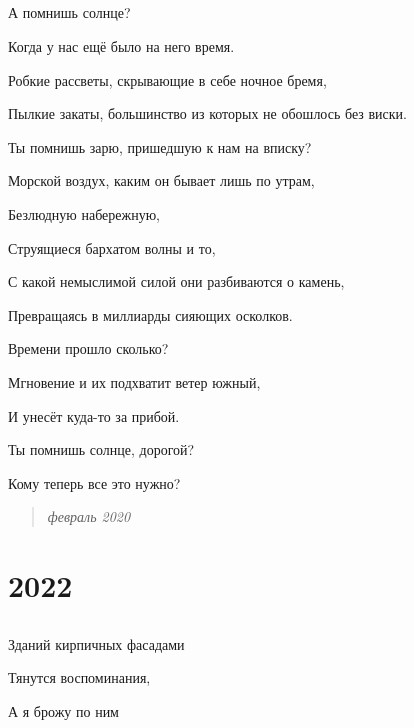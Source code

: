 \documentclass[
  a5paperpaper,
  DIV=11,
  numbers=noendperiod]{scrreprt}
\begin{document}

\section*{}\label{section-9}

\markright{}

А помнишь солнце?

Когда у нас ещё было на него время.

Робкие рассветы, скрывающие в себе ночное бремя,

Пылкие закаты, большинство из которых не обошлось без виски.

Ты помнишь зарю, пришедшую к нам на вписку?

Морской воздух, каким он бывает лишь по утрам,

Безлюдную набережную,

Струящиеся бархатом волны и то,

С какой немыслимой силой они разбиваются о камень,

Превращаясь в миллиарды сияющих осколков.

Времени прошло сколько?

Мгновение и их подхватит ветер южный,

И унесёт куда-то за прибой.

Ты помнишь солнце, дорогой?

Кому теперь все это нужно?

\begin{quote}
\emph{февраль 2020}
\end{quote}


\chapter*{2022}\label{section-10}


\section*{}\label{section-11}

\markright{}

Зданий кирпичных фасадами

Тянутся воспоминания,

А я брожу по ним
\end{document}
